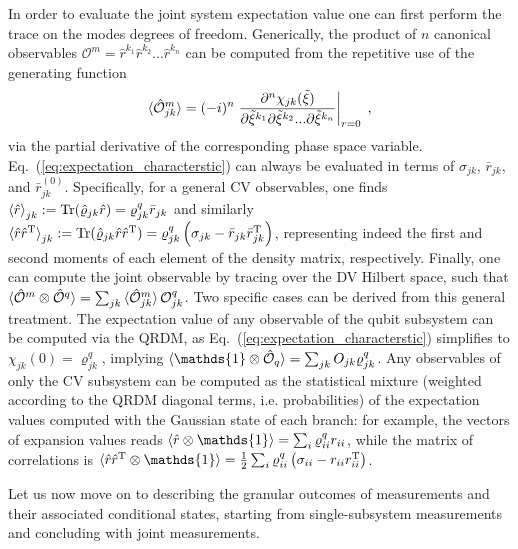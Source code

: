 \documentclass[%
reprint,
superscriptaddress,
nofootinbib,
 amsmath,amssymb,
prx,
floatfix,
]{revtex4-2}
\begin{document}
In order to evaluate the joint system expectation value one can first perform the trace on the modes degrees of freedom. Generically, the product of $n$ canonical observables $\mathcal{O}^m = \hat{r}^{k_1} \hat{r}^{k_2}... \hat{r}^{k_n} $ can be computed from the repetitive use of the generating function
\begin{equation}
\label{eq:expectation_characterstic}
    \braket{\hat{\mathcal{O}}^m_{jk}} = (-i )^n \left. \frac{\partial^{n} \chi_{jk}(\tilde{\xi})}{\partial \tilde{\xi}^{k_1} \partial \tilde{\xi}^{k_2} ... \partial \tilde{\xi}^{k_n}} \right|_{r=0} \;,
\end{equation}
via the partial derivative of the corresponding phase space variable. Eq.~(\ref{eq:expectation_characterstic}) can always be evaluated in terms of $\sigma_{jk}$, $\bar{r}_{jk}$, and $\bar{r}_{jk}^{(0)}$. Specifically, for a general CV observables, one finds $\braket{\hat{r}}_{jk} := \text{Tr} (\hat{\varrho}_{jk} \hat{r}) = \varrho_{jk}^q \bar{r}_{jk}$ and similarly $\braket{\hat{r} \hat{r}^{\rm T}}_{jk} := \text{Tr} (\hat{\varrho}_{jk}\hat{r} \hat{r}^{\rm T}) = \varrho_{jk}^q  \left( \sigma_{jk} - \bar{r}_{jk} \bar{r}_{jk}^{\rm T} \right)$, representing indeed the first and second moments of each element of the density matrix, respectively. Finally, one can compute the joint observable by tracing over the DV Hilbert space, such that $\braket{\hat{\mathcal{O}}^m\otimes\hat{\mathcal{O}}^q} = \sum_{jk} \braket{\hat{\mathcal{O}}^m_{jk}} \mathcal{O}_{jk}^q$. Two specific cases can be derived from this general treatment. The expectation value of any observable of the qubit subsystem can be computed via the QRDM, as Eq.~(\ref{eq:expectation_characterstic}) simplifies to $\chi_{jk} (0) = \varrho_{jk}^q$, implying $\braket{\mathds{1} \otimes \hat{\mathcal{O}}_q } = \sum_{jk} O_{jk} \varrho^{q}_{jk}  $. Any observables of only the CV subsystem can be computed as the statistical mixture (weighted according to the QRDM diagonal terms, i.e. probabilities) of the expectation values computed with the Gaussian state of each branch: for example, the vectors of expansion values reads $\braket{\hat{r} \otimes \mathds{1}} = \sum_{i} \varrho_{ii}^q r_{ii} $, while the matrix of correlations is $\braket{\hat{r}\hat{r}^{\rm T} \otimes \mathds{1}} = \frac{1}{2}\sum_{i} \varrho_{ii}^q \left( \sigma_{ii} - r_{ii} r_{ii}^{\rm T} \right)$. 



Let us now move on to describing the granular outcomes of measurements and their associated conditional states, starting from single-subsystem measurements and concluding with joint measurements.
\end{document}
